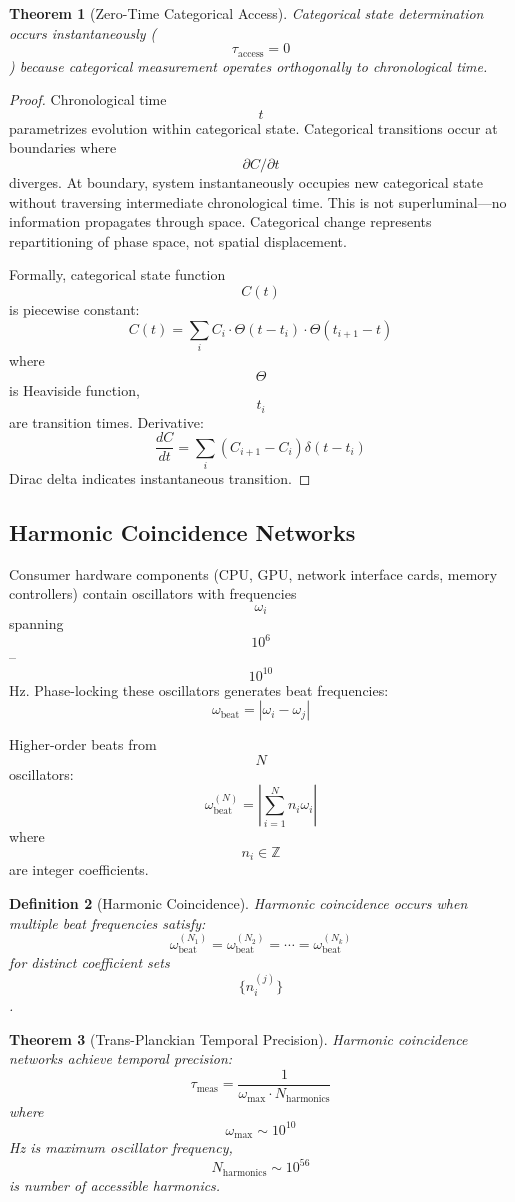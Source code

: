 \documentclass[11pt,twocolumn,a4paper]{article}
\newtheorem{theorem}{Theorem}[section]
\newtheorem{definition}[theorem]{Definition}
\theoremstyle{remark}
\begin{document}
\begin{theorem}[Zero-Time Categorical Access]
\label{thm:zero_time_access}
Categorical state determination occurs instantaneously ($$\tau_{\mathrm{access}} = 0$$) because categorical measurement operates orthogonally to chronological time.
\end{theorem}

\begin{proof}
Chronological time $$t$$ parametrizes evolution within categorical state. Categorical transitions occur at boundaries where $$\partial C/\partial t$$ diverges. At boundary, system instantaneously occupies new categorical state without traversing intermediate chronological time. This is not superluminal---no information propagates through space. Categorical change represents repartitioning of phase space, not spatial displacement.

Formally, categorical state function $$C(t)$$ is piecewise constant:
$$
C(t) = \sum_{i} C_i \cdot \Theta(t - t_i) \cdot \Theta(t_{i+1} - t)
$$
where $$\Theta$$ is Heaviside function, $$t_i$$ are transition times. Derivative:
$$
\frac{dC}{dt} = \sum_i (C_{i+1} - C_i) \delta(t - t_i)
$$
Dirac delta indicates instantaneous transition.
\end{proof}

\subsection{Harmonic Coincidence Networks}

Consumer hardware components (CPU, GPU, network interface cards, memory controllers) contain oscillators with frequencies $$\omega_i$$ spanning $$10^6$$--$$10^{10}$$ Hz. Phase-locking these oscillators generates beat frequencies:
$$
\omega_{\mathrm{beat}} = |\omega_i - \omega_j|
$$

Higher-order beats from $$N$$ oscillators:
$$
\omega_{\mathrm{beat}}^{(N)} = \left|\sum_{i=1}^N n_i \omega_i\right|
$$
where $$n_i \in \mathbb{Z}$$ are integer coefficients.

\begin{definition}[Harmonic Coincidence]
\label{def:harmonic_coincidence}
Harmonic coincidence occurs when multiple beat frequencies satisfy:
$$
\omega_{\mathrm{beat}}^{(N_1)} = \omega_{\mathrm{beat}}^{(N_2)} = \cdots = \omega_{\mathrm{beat}}^{(N_k)}
$$
for distinct coefficient sets $$\{n_i^{(j)}\}$$.
\end{definition}

\begin{theorem}[Trans-Planckian Temporal Precision]
\label{thm:harmonic_precision}
Harmonic coincidence networks achieve temporal precision:
$$
\tau_{\mathrm{meas}} = \frac{1}{\omega_{\mathrm{max}} \cdot N_{\mathrm{harmonics}}}
$$
where $$\omega_{\mathrm{max}} \sim 10^{10}$$ Hz is maximum oscillator frequency, $$N_{\mathrm{harmonics}} \sim 10^{56}$$ is number of accessible harmonics.
\end{theorem}
\end{document}
